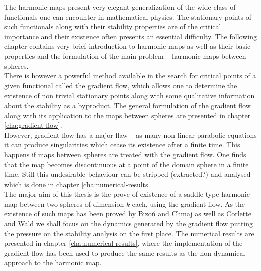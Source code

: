 The harmonic maps present very elegant generalization of the wide
class of functionals one can encounter in mathematical physics. The
stationary points of such functionals along with their stability
properties are of the critical importance and their existence often
presents an essential difficulty. The following chapter contains very
brief introduction to harmonic maps as well as their basic properties
and the formulation of the main problem -- harmonic maps between
spheres.
\\
There is however a powerful method available in the search for
critical points of a given functional called the gradient flow, which
allows one to determine the existence of non trivial stationary points
along with some qualitative information about the stability as a
byproduct. The general formulation of the gradient flow along with its
application to the maps between spheres are presented in chapter
\ref{cha:gradient-flow}.
\\
However, gradient flow has a major flaw -- as many non-linear
parabolic equations it can produce singularities which cease its
existence after a finite time. This happens if maps between spheres
are treated with the gradient flow. One finds that the map becomes
discontinuous at a point of the domain sphere in a finite time. Still
this undesirable behaviour can be stripped (extracted?) and analysed
which is done in chapter \ref{cha:numerical-results}.
\\
The major aim of this thesis is the prove of existence of a
saddle-type harmonic map between two spheres of dimension $k$ each,
using the gradient flow. As the existence of such maps has been proved
by Bizoń and Chmaj \cite{Bizon1997} as well as Corlette and Wald
\cite{Corlette2001} we shall focus on the dynamics generated by the
gradient flow putting the pressure on the stability analysis on the
first place. The numerical results are presented in chapter
\ref{cha:numerical-results}, where the implementation of the gradient
flow has been used to produce the same results as the non-dynamical
approach to the harmonic map.




